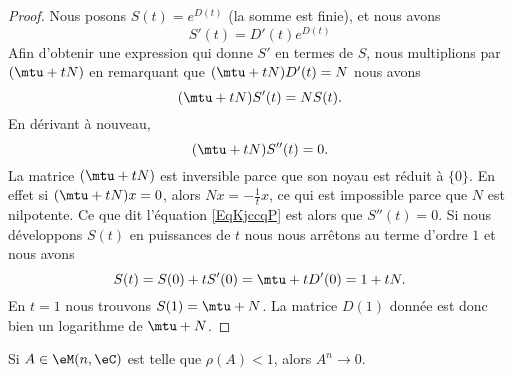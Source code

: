 \begin{proof}
    Nous posons \( S(t)= e^{D(t)}\) (la somme est finie), et nous avons
    \begin{equation}
        S'(t)=D'(t) e^{D(t)}
    \end{equation}
    Afin d'obtenir une expression qui donne \( S'\) en termes de \( S\), nous multiplions par \( (\mtu+tN)\) en remarquant que \( (\mtu+tN)D'(t)=N\) nous avons
    \begin{equation}
        (\mtu+tN)S'(t)=NS(t).
    \end{equation}
    En dérivant à nouveau,
    \begin{equation}    \label{EqKjccqP}
        (\mtu+tN)S''(t)=0.
    \end{equation}
    La matrice \( (\mtu+tN)\) est inversible parce que son noyau est réduit à \( \{ 0 \}\). En effet si \( (\mtu+tN)x=0\), alors \( Nx=-\frac{1}{ t }x\), ce qui est impossible parce que \( N\) est nilpotente. Ce que dit l'équation \eqref{EqKjccqP} est alors que \( S''(t)=0\). Si nous développons \( S(t)\) en puissances de \( t\) nous nous arrêtons au terme d'ordre \( 1\) et nous avons
    \begin{equation}
        S(t)=S(0)+tS'(0)=\mtu+tD'(0)=1+tN.
    \end{equation}
    En \( t=1\) nous trouvons \( S(1)=\mtu+N\). La matrice \( D(1)\) donnée est donc bien un logarithme de $\mtu+N$.
\end{proof}

\begin{proposition}
    Si \( A\in \eM(n,\eC)\) est telle que \( \rho(A)<1\), alors \( A^n\to 0\).
\end{proposition}

